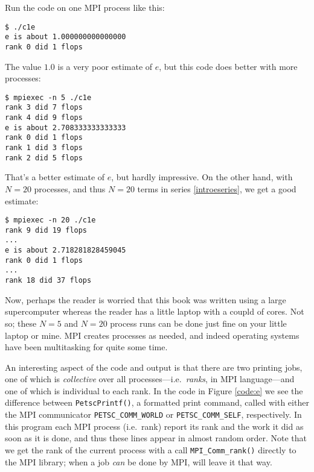 
Run the code on one MPI process like this:
\begin{Verbatim}[fontsize=\small]
$ ./c1e
e is about 1.000000000000000
rank 0 did 1 flops
\end{Verbatim}
The value $1.0$ is a very poor estimate of $e$, but this code does better with more processes:
\begin{Verbatim}[fontsize=\small]
$ mpiexec -n 5 ./c1e
rank 3 did 7 flops
rank 4 did 9 flops
e is about 2.708333333333333
rank 0 did 1 flops
rank 1 did 3 flops
rank 2 did 5 flops
\end{Verbatim}
That's a better estimate of $e$, but hardly impressive.  On the other hand, with $N=20$ processes, and thus $N=20$ terms in series \eqref{introeseries}, we get a good estimate:
\begin{Verbatim}[fontsize=\small]
$ mpiexec -n 20 ./c1e
rank 9 did 19 flops
...
e is about 2.718281828459045
rank 0 did 1 flops
...
rank 18 did 37 flops
\end{Verbatim}


Now, perhaps the reader is worried that this book was written using a large supercomputer whereas the reader has a little laptop with a coupld of cores.  Not so; these $N=5$ and $N=20$ process runs can be done just fine on your little laptop or mine.  MPI creates processes as needed, and indeed operating systems have been multitasking for quite some time.

An interesting aspect of the code and output is that there are two printing jobs, one of which is \emph{collective} over all processes---i.e.~\emph{ranks}, in MPI language---and one of which is individual to each rank.  In the code in Figure \ref{code:e} we see the difference between \texttt{PetscPrintf()}, a formatted print command, called with either the MPI communicator \texttt{PETSC\_COMM\_WORLD} or \texttt{PETSC\_COMM\_SELF}, respectively.  In this program each MPI process (i.e.~rank) report its rank and the work it did as soon as it is done, and thus these lines appear in almost random order.  Note that we get the rank of the current process with a call \texttt{MPI\_Comm\_rank()} directly to the MPI library; when a job \emph{can} be done by MPI, \PETSc will leave it that way.

